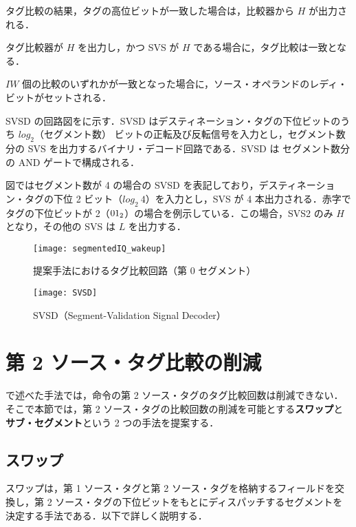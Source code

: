 タグ比較の結果，タグの高位ビットが一致した場合は，比較器から $H$ が出力される．

タグ比較器が $H$ を出力し，かつ SVS が $H$ である場合に，タグ比較は一致となる．

$IW$ 個の比較のいずれかが一致となった場合に，ソース・オペランドのレディ・ビットがセットされる．

SVSD の回路図をに示す．SVSD はデスティネーション・タグの下位ビットのうち $log_2（セグメント数）$ ビットの正転及び反転信号を入力とし，セグメント数分の SVS を出力するバイナリ・デコード回路である．SVSD は セグメント数分の AND ゲートで構成される．

図ではセグメント数が 4 の場合の SVSD を表記しており，デスティネーション・タグの下位 2 ビット（$log_2\:4$）を入力とし，SVS が 4 本出力される．赤字でタグの下位ビットが 2（${\rm 01_2}$）の場合を例示している．この場合，SVS2 のみ $H$ となり，その他の SVS は $L$ を出力する． 


\begin{figure}[thb]
  \centering
  \texttt{[image: segmentedIQ\_wakeup]}
  \caption{提案手法におけるタグ比較回路（第 0 セグメント）}
  \label{fig:segmentedIQ_wakeup}
\end{figure}

\begin{figure}[htb]
  \centering
  \texttt{[image: SVSD]}
  \caption{SVSD（Segment-Validation Signal Decoder）}
  \label{fig:SVSD}
\end{figure}

\clearpage

\section{第 2 ソース・タグ比較の削減}
\label{sec:second_tag_comp}
で述べた手法では，命令の第 2 ソース・タグのタグ比較回数は削減できない．そこで本節では，第 2 ソース・タグの比較回数の削減を可能とする\textbf{スワップ}と\textbf{サブ・セグメント}という 2 つの手法を提案する．

\subsection{スワップ}
\label{sec:swap}
スワップは，第 1 ソース・タグと第 2 ソース・タグを格納するフィールドを交換し，第 2 ソース・タグの下位ビットをもとにディスパッチするセグメントを決定する手法である．以下で詳しく説明する．

